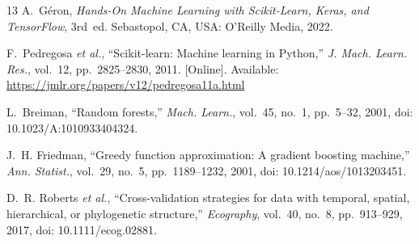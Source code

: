 \documentclass[journal]{IEEEtran}
\begin{document}
\begin{thebibliography}{13}
A.~G\'{e}ron, \emph{Hands-On Machine Learning with Scikit-Learn, Keras, and TensorFlow}, 3rd~ed.
Sebastopol, CA, USA: O'Reilly Media, 2022.

F.~Pedregosa \emph{et al.}, ``Scikit-learn: Machine learning in Python,'' \emph{J. Mach. Learn. Res.},
vol.~12, pp.~2825--2830, 2011. [Online]. Available: \url{https://jmlr.org/papers/v12/pedregosa11a.html}

L.~Breiman, ``Random forests,'' \emph{Mach. Learn.}, vol.~45, no.~1, pp.~5--32, 2001,
doi: 10.1023/A:1010933404324.

J.~H. Friedman, ``Greedy function approximation: A gradient boosting machine,''
\emph{Ann. Statist.}, vol.~29, no.~5, pp.~1189--1232, 2001, doi: 10.1214/aos/1013203451.

D.~R. Roberts \emph{et al.}, ``Cross-validation strategies for data with temporal, spatial,
hierarchical, or phylogenetic structure,'' \emph{Ecography}, vol.~40, no.~8, pp.~913--929, 2017,
doi: 10.1111/ecog.02881.

\end{thebibliography}
\end{document}
